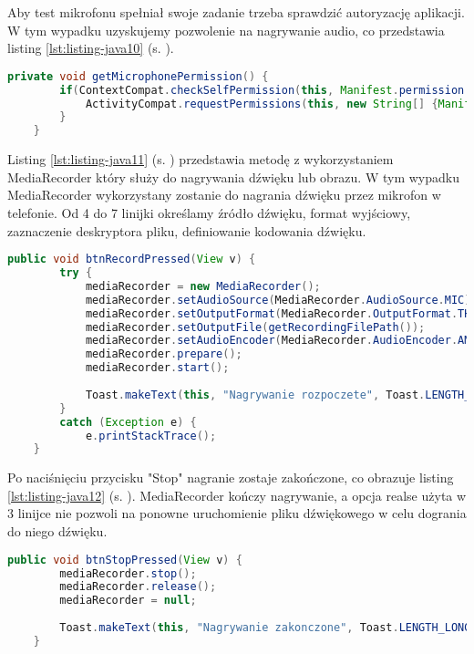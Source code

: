 \newpage


Aby test mikrofonu spełniał swoje zadanie trzeba sprawdzić autoryzację aplikacji. W tym wypadku uzyskujemy pozwolenie na nagrywanie audio, co przedstawia listing \ref{lst:listing-java10} (s. \pageref{lst:listing-java10}). 
\begin{lstlisting}[caption=Mikrofon - Dostęp do nagrywania audio, label={lst:listing-java10}, language=Java]
	private void getMicrophonePermission() {
		if(ContextCompat.checkSelfPermission(this, Manifest.permission.RECORD_AUDIO) == PackageManager.PERMISSION_DENIED) {
			ActivityCompat.requestPermissions(this, new String[] {Manifest.permission.RECORD_AUDIO}, MICROPHONE_PERMISSION_CODE);
		}
	}
\end{lstlisting}


Listing \ref{lst:listing-java11} (s. \pageref{lst:listing-java11}) przedstawia metodę z wykorzystaniem MediaRecorder który służy do nagrywania dźwięku lub obrazu. W tym wypadku MediaRecorder wykorzystany zostanie do nagrania dźwięku przez mikrofon w telefonie. Od 4 do 7 linijki określamy źródło dźwięku, format wyjściowy, zaznaczenie deskryptora pliku, definiowanie kodowania dźwięku.
\begin{lstlisting}[caption=Mikrofon - Włączenie nagrywania, label={lst:listing-java11}, language=Java]
	public void btnRecordPressed(View v) {
		try {
			mediaRecorder = new MediaRecorder();
			mediaRecorder.setAudioSource(MediaRecorder.AudioSource.MIC);
			mediaRecorder.setOutputFormat(MediaRecorder.OutputFormat.THREE_GPP);
			mediaRecorder.setOutputFile(getRecordingFilePath());
			mediaRecorder.setAudioEncoder(MediaRecorder.AudioEncoder.AMR_NB);
			mediaRecorder.prepare();
			mediaRecorder.start();
			
			Toast.makeText(this, "Nagrywanie rozpoczete", Toast.LENGTH_LONG).show();
		}
		catch (Exception e) {
			e.printStackTrace();
	}
\end{lstlisting}
	
\newpage
	
	
Po naciśnięciu przycisku "Stop" nagranie zostaje zakończone, co obrazuje listing \ref{lst:listing-java12} (s. \pageref{lst:listing-java12}). MediaRecorder kończy nagrywanie, a opcja realse użyta w 3 linijce nie pozwoli na ponowne uruchomienie pliku dźwiękowego w celu dogrania do niego dźwięku.
\begin{lstlisting}[caption=Mikrofon - Przerwanie nagrywania, label={lst:listing-java12}, language=Java]
	public void btnStopPressed(View v) {
		mediaRecorder.stop();
		mediaRecorder.release();
		mediaRecorder = null;
			
		Toast.makeText(this, "Nagrywanie zakonczone", Toast.LENGTH_LONG).show();
	}
\end{lstlisting}
	
